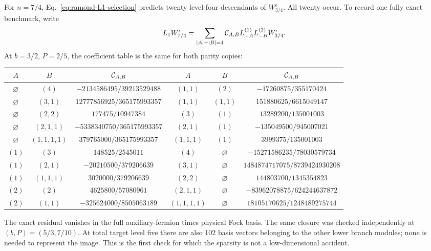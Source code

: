 \documentclass[11pt]{article}
\begin{document}
For \(n=7/4\), Eq.~\eqref{eq:ramond-L1-selection} predicts twenty
level-four descendants of \(W_{3/4}^{\epsilon}\).  All twenty occur.  To
record one fully exact benchmark, write
\begin{equation}
 L_1W_{7/4}^{\epsilon}
 =\sum_{|A|+|B|=4}{\cal C}_{A,B}
 L_{-A}^{(1)}L_{-B}^{(2)}W_{3/4}^{\epsilon}.
 \label{eq:ramond-L1-seven-quarter-benchmark}
\end{equation}
At \(b=3/2\), \(P=2/5\), the coefficient table is the same for both parity
copies:
\begin{center}
\scriptsize
\begin{tabular}{c c c@{\qquad}c c c}
\(A\)&\(B\)&\({\cal C}_{A,B}\)&\(A\)&\(B\)&\({\cal C}_{A,B}\)\\[2pt]
\hline
\(\varnothing\)&\((4)\)&\(-2134586495/39213529488\)&
\((1,1)\)&\((2)\)&\(-17260875/355170424\)\\
\(\varnothing\)&\((3,1)\)&\(12777856925/365175993357\)&
\((1,1)\)&\((1,1)\)&\(151880625/6615049147\)\\
\(\varnothing\)&\((2,2)\)&\(177475/10947384\)&
\((3)\)&\((1)\)&\(13289200/135001003\)\\
\(\varnothing\)&\((2,1,1)\)&\(-5338340750/365175993357\)&
\((2,1)\)&\((1)\)&\(-135049500/945007021\)\\
\(\varnothing\)&\((1,1,1,1)\)&\(379765000/365175993357\)&
\((1,1,1)\)&\((1)\)&\(3999375/135001003\)\\
\((1)\)&\((3)\)&\(148525/2545011\)&
\((4)\)&\(\varnothing\)&\(-15271586235/78030579734\)\\
\((1)\)&\((2,1)\)&\(-20210500/379206639\)&
\((3,1)\)&\(\varnothing\)&\(1484874717075/8739424930208\)\\
\((1)\)&\((1,1,1)\)&\(3020000/379206639\)&
\((2,2)\)&\(\varnothing\)&\(144803700/1345354823\)\\
\((2)\)&\((2)\)&\(4625800/57080961\)&
\((2,1,1)\)&\(\varnothing\)&\(-83962078875/624244637872\)\\
\((2)\)&\((1,1)\)&\(-325624000/8505063189\)&
\((1,1,1,1)\)&\(\varnothing\)&\(18105170625/1248489275744\)
\end{tabular}
\end{center}
The exact residual vanishes in the full auxiliary-fermion times physical
Fock basis.  The same closure was checked independently at
\((b,P)=(5/3,7/10)\).  At total target level five there are also 102 basis
vectors belonging to the other lower branch modules; none is needed to
represent the image.  This is the first check for which the sparsity is not
a low-dimensional accident.
\end{document}
